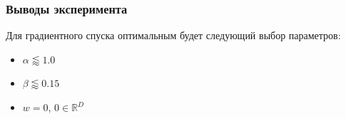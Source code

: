 \subsubsection{Выводы эксперимента}
Для градиентного спуска оптимальным будет следующий выбор параметров:
\begin{itemize}
	\item $\alpha \lessapprox\!1.0$
	\item $\beta \lessapprox\!0.15$
	\item $w = 0$, $0 \in \mathbb{R}^D$
\end{itemize}

